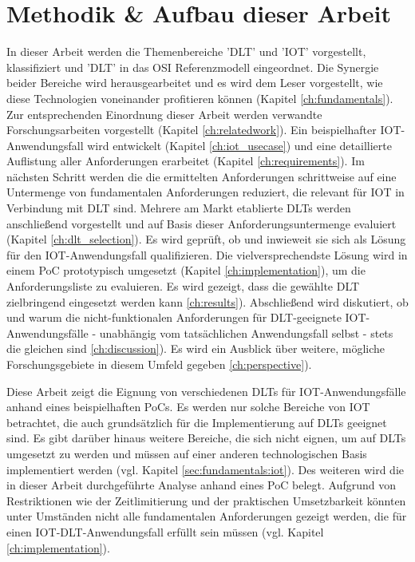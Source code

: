 \section{Methodik \& Aufbau dieser Arbeit}
\label{sec:intro:methodology}
In dieser Arbeit werden die Themenbereiche '\ac{DLT}' und '\ac{IOT}' vorgestellt, klassifiziert und '\ac{DLT}' in das \ac{OSI} Referenzmodell eingeordnet. Die Synergie beider Bereiche wird herausgearbeitet und es wird dem Leser vorgestellt, wie diese Technologien voneinander profitieren können (Kapitel \ref{ch:fundamentals}). Zur entsprechenden Einordnung dieser Arbeit werden verwandte Forschungsarbeiten vorgestellt (Kapitel \ref{ch:relatedwork}). Ein beispielhafter \ac{IOT}-Anwendungsfall wird entwickelt (Kapitel \ref{ch:iot_usecase}) und eine detaillierte Auflistung aller Anforderungen erarbeitet (Kapitel \ref{ch:requirements}). Im nächsten Schritt werden die die ermittelten Anforderungen schrittweise auf eine Untermenge von fundamentalen Anforderungen reduziert, die relevant für \ac{IOT} in Verbindung mit \ac{DLT} sind. Mehrere am Markt etablierte \ac{DLT}s werden anschließend vorgestellt und auf Basis dieser Anforderungsuntermenge evaluiert (Kapitel \ref{ch:dlt_selection}). Es wird geprüft, ob und inwieweit sie sich als Lösung für den \ac{IOT}-Anwendungsfall qualifizieren. Die vielversprechendste Lösung wird in einem \ac{PoC} prototypisch umgesetzt (Kapitel \ref{ch:implementation}), um die Anforderungsliste zu evaluieren. Es wird gezeigt, dass die gewählte \ac{DLT} zielbringend eingesetzt werden kann \ref{ch:results}). Abschließend wird diskutiert, ob und warum die nicht-funktionalen Anforderungen für \ac{DLT}-geeignete \ac{IOT}-Anwendungsfälle - unabhängig vom tatsächlichen Anwendungsfall selbst - stets die gleichen sind \ref{ch:discussion}). Es wird ein Ausblick über weitere, mögliche Forschungsgebiete in diesem Umfeld gegeben \ref{ch:perspective}).

Diese Arbeit zeigt die Eignung von verschiedenen \ac{DLT}s für \ac{IOT}-Anwendungsfälle anhand eines beispielhaften \ac{PoC}s. Es werden nur solche Bereiche von \ac{IOT} betrachtet, die auch grundsätzlich für die Implementierung auf \ac{DLT}s geeignet sind. Es gibt darüber hinaus weitere Bereiche, die sich nicht eignen, um auf \ac{DLT}s umgesetzt zu werden und müssen auf einer anderen technologischen Basis implementiert werden (vgl. Kapitel \ref{sec:fundamentals:iot}). Des weiteren wird die in dieser Arbeit durchgeführte Analyse anhand eines \ac{PoC} belegt. Aufgrund von Restriktionen wie der Zeitlimitierung und der praktischen Umsetzbarkeit könnten unter Umständen nicht alle fundamentalen Anforderungen gezeigt werden, die für einen \ac{IOT}-\ac{DLT}-Anwendungsfall erfüllt sein müssen (vgl. Kapitel \ref{ch:implementation}).
